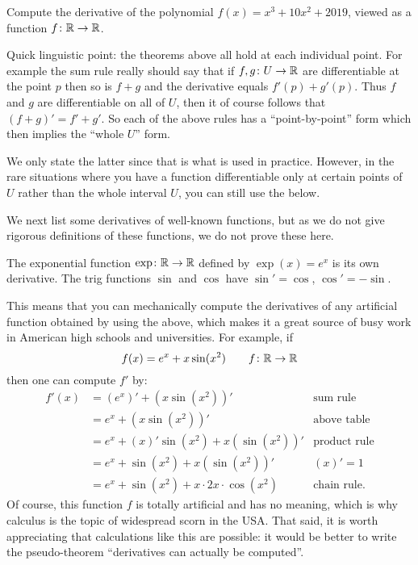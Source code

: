 \begin{exercise}
	Compute the derivative of the polynomial $f(x) = x^3 + 10x^2 + 2019$,
	viewed as a function $f \colon \mathbb R \to \mathbb R$.
\end{exercise}

\begin{remark}
	Quick linguistic point:
	the theorems above all hold at each individual point.
	For example the sum rule really should say that
	if $f,g \colon U \to \mathbb R$ are differentiable at the point $p$
	then so is $f+g$ and the derivative equals $f'(p) + g'(p)$.
	Thus $f$ and $g$ are differentiable on all of $U$,
	then it of course follows that $(f+g)' = f' + g'$.
	So each of the above rules has a ``point-by-point'' form
	which then implies the ``whole $U$'' form.

	We only state the latter since that is what is used in practice.
	However, in the rare situations where you have a function
	differentiable only at certain points of $U$ rather
	than the whole interval $U$, you can still use the below.
\end{remark}

We next list some derivatives of
well-known functions,
but as we do not give rigorous definitions
of these functions, we do not prove these here.
\begin{proposition}
	\listhack
	\begin{itemize}
		\ii The exponential function $\exp \colon \mathbb R \to \mathbb R$
		defined by $\exp(x) = e^x$ is its own derivative.
		\ii The trig functions $\sin$ and $\cos$
		have $\sin' = \cos$, $\cos' = -\sin$.
	\end{itemize}
\end{proposition}

\begin{example}
	This means that you can mechanically compute
	the derivatives of any artificial function obtained by using the above,
	which makes it a great source of busy work
	in American high schools and universities.
	For example, if
	\[ f(x) = e^x + x \sin(x^2) \qquad f \colon \mathbb R \to \mathbb R \]
	then one can compute $f'$ by:
	\begin{align*}
		f'(x) &= (e^x)' + (x \sin(x^2))' & \text{sum rule} \\
		&= e^x + (x \sin(x^2))' & \text{above table} \\
		&= e^x + (x)' \sin(x^2) + x (\sin(x^2))' & \text{product rule} \\
		&= e^x + \sin(x^2) + x (\sin(x^2))' & (x)' = 1 \\
		&= e^x + \sin(x^2) + x \cdot 2x \cdot \cos(x^2) & \text{chain rule}.
	\end{align*}
	Of course, this function $f$ is totally artificial and has no meaning,
	which is why calculus is the topic of widespread scorn in the USA.
	That said, it is worth appreciating that calculations like
	this are possible: it would be better to write the pseudo-theorem
	``derivatives can actually be computed''.
\end{example}

